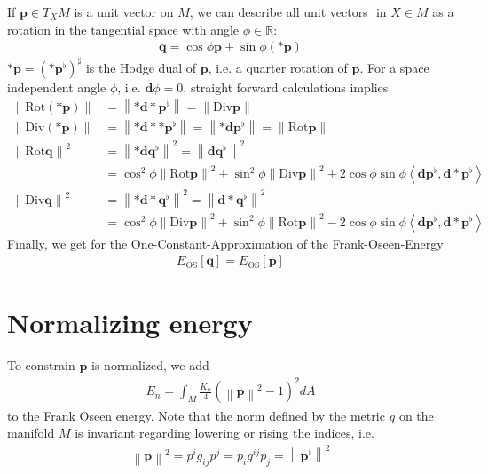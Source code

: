 \documentclass[a4paper,11pt]{scrartcl}
\newcommand{\exd}{\mathbf{d}}
\newcommand{\Div}{\text{Div}}
\newcommand{\Rot}{\text{Rot}}
\newcommand{\R}{\mathds{R}}
\newcommand{\M}{M}
\newcommand{\dA}{dA}
\newcommand{\p}{\mathbf{p}}
\newcommand{\q}{\mathbf{q}}
\newcommand{\pfl}{\mathbf{p}^{\flat}}
\newcommand{\qfl}{\mathbf{q}^{\flat}}
\newcommand{\EOS}{E_{\text{OS}}}
\newcommand{\EN}{E_{n}}
\begin{document}
  If \( \p\in T_{X}\M \) is a unit vector on \( \M \), we can describe all unit vectors \(  \) in \( X\in\M \) as a rotation in the tangential space
  with angle \( \phi\in\R \):
  \begin{align}
    \q = \cos\phi\p + \sin\phi\left( *\p \right)
  \end{align}
  \( *\p = \left( *\pfl \right)^{\sharp}\) is the Hodge dual of \( \p \), i.e. a quarter rotation of \( \p \). 
  For a space independent angle \( \phi \), i.e. \( \exd\phi=0 \), straight forward calculations implies
  \begin{align}
     \left\| \Rot (*\p) \right\| &=  \left\| *\exd*\pfl \right\| = \left\| \Div\p \right\|\\
     \left\| \Div (*\p) \right\| &= \left\| *\exd**\pfl  \right\| = \left\| *\exd\pfl  \right\| = \left\|\Rot\p\right\|\\ 
     \left\| \Rot\q \right\|^{2} &= \left\| *\exd\qfl \right\|^{2} = \left\| \exd\qfl \right\|^{2} \\
                                      &=  \cos^{2}\phi\left\| \Rot\p \right\|^{2} 
                                        + \sin^{2}\phi\left\| \Div\p \right\|^{2}
                                        + 2\cos\phi\sin\phi\left\langle \exd\pfl, \exd * \pfl \right\rangle\\
    \left\| \Div\q \right\|^{2} &= \left\| *\exd*\qfl \right\|^{2} = \left\| \exd*\qfl \right\|^{2}\\
                                     &= \cos^{2}\phi\left\| \Div\p \right\|^{2} 
                                        + \sin^{2}\phi\left\| \Rot\p \right\|^{2}
                                        - 2\cos\phi\sin\phi\left\langle \exd\pfl, \exd * \pfl \right\rangle  
  \end{align}
  Finally, we get for the One-Constant-Approximation of the Frank-Oseen-Energy
  \begin{align}
    \EOS[\q] = \EOS[\p]
  \end{align}


\section{Normalizing energy}

To constrain \( \p \) is normalized, we add
\begin{align}
  \EN = \int_{\M} \frac{K_{n}}{4} \left( \left\| \p \right\|^{2} - 1 \right)^{2} \dA
\end{align}
to the Frank Oseen energy.
Note that the norm defined by the metric \( g \) on the manifold \( \M \) is invariant regarding lowering or rising the indices, i.e.
\begin{align}
  \left\| \p \right\|^{2} = p^{i}g_{ij}p^{j} = p_{i} g^{ij} p_{j} = \left\| \pfl \right\|^{2}
\end{align}
\end{document}
